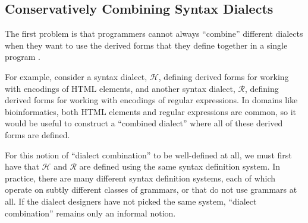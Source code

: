 \subsection{Conservatively Combining Syntax Dialects}

The first problem is that programmers cannot always ``combine'' different dialects when they want to use the derived forms that they define together in a single program \cite{DeRemer76}.

For example, consider a syntax dialect, $\mathcal{H}$, defining derived forms for working with encodings of HTML elements, and another syntax dialect, $\mathcal{R}$,  defining derived forms for working with encodings of regular expressions. In domains like bioinformatics, both HTML elements and regular expressions are common, so it would be useful to construct a ``combined dialect'' where all of these derived forms are defined. 

For this notion of ``dialect combination'' to be well-defined at all, we must first have that $\mathcal{H}$ and $\mathcal{R}$ are defined using the same syntax definition system. In practice, there are many different syntax definition systems, each of which operate on subtly different classes of grammars, or that do not use grammars at all. If the dialect designers  have not  picked the same system, ``dialect combination'' remains only an informal notion.%

